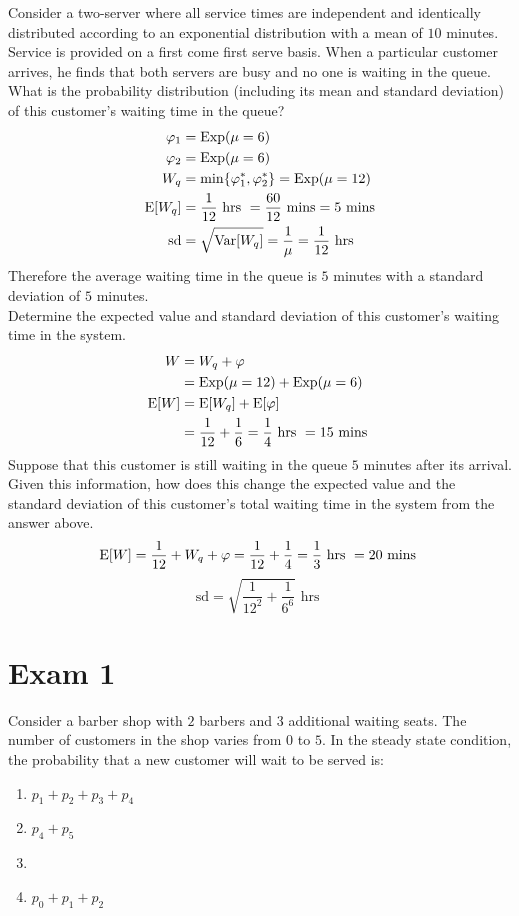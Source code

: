 \documentclass[12pt]{article}
\begin{document}
 Consider a two-server \qs where all service times are independent and identically distributed according to an exponential distribution with a mean of $10$ minutes. Service is provided on a first come first serve basis. When a particular customer arrives, he finds that both servers are busy and no one is waiting in the queue. What is the probability distribution (including its mean and standard deviation) of this customer's waiting time in the queue? 
 $$ \begin{aligned} \varphi_1 &= \text{Exp}( \mu = 6 ) \\ \varphi_2 &= \text{Exp}( \mu = 6 ) \\ W_q &= \min\{ \varphi_1^*, \varphi_2^*\} = \text{Exp}( \mu = 12 ) \\ \mathrm{E}[ W_q ] &= \frac{1}{12} \text{ hrs } = \frac{60}{12} \text{ mins} = 5 \text{ mins} \\ \text{sd} &= \sqrt{\mathrm{Var}[ W_q ]} = \frac{1}{\mu} = \frac{1}{12} \text{ hrs }  \end{aligned} $$ 
 Therefore the average waiting time in the queue is $5$ minutes with a standard deviation of $5$ minutes. \\
 Determine the expected value and standard deviation of this customer's waiting time in the system. 
 $$ \begin{aligned} W &= W_q + \varphi \\ &= \text{Exp}( \mu = 12 ) + \text{Exp}( \mu = 6 ) \\ \mathrm{E}[ W ] &= \mathrm{E}[ W_q ] + \mathrm{E}[ \varphi ] \\  &= \frac{1}{12} + \frac{1}{6} = \frac{1}{4} \text{ hrs } = 15 \text{ mins } \end{aligned} $$ 
 Suppose that this customer is still waiting in the queue $5$ minutes after its arrival. Given this information, how does this change the expected value and the standard deviation of this customer's total waiting time in the system from the answer above. 
 $$ \mathrm{E}[ W ] = \frac{1}{12} + W_q + \varphi = \frac{1}{12} + \frac{1}{4} = \frac{1}{3} \text{ hrs } = 20 \text{ mins } $$ 
 $$ \text{sd} = \sqrt{ \frac{1}{12^2} + \frac{1}{6^6}} \text{ hrs } $$ 
 
 \section{Exam 1} 
 
 \begin{question} Consider a barber shop with $2$ barbers and $3$ additional waiting seats. The number of customers in the shop varies from $0$ to $5$. In the steady state condition, the probability that a new customer will wait to be served is: \begin{enumerate} 
 \item $p_1 + p_2 + p_3 + p_4$ 
 \item $p_4 + p_5$ 
 \item {}
 \item $p_0 + p_1 + p_2$ \end{enumerate} \end{question}
 
\end{document}
